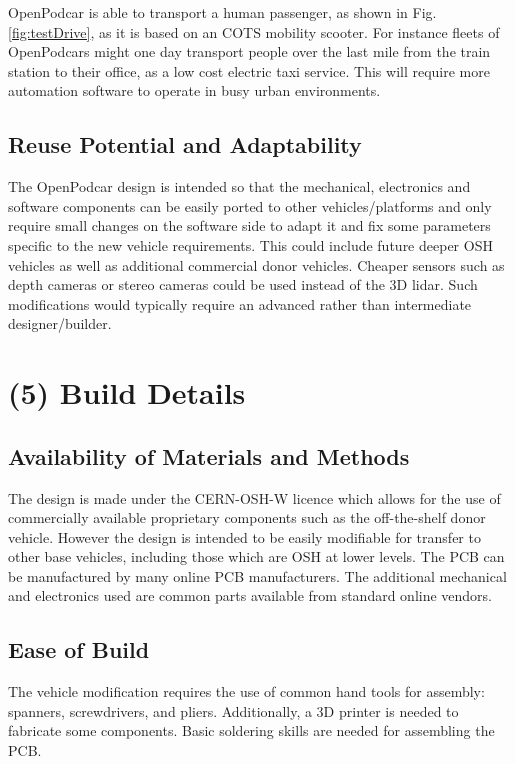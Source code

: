 \documentclass[a4paper]{article}
\begin{document}
	OpenPodcar is able to transport a human passenger, as shown in Fig. \ref{fig:testDrive}, as it is based on an COTS mobility scooter.  For instance fleets of OpenPodcars might one day transport people over the last mile from the train station to their office, as a low cost electric taxi service. This will require more automation software to operate in busy urban environments.
	
	\subsection{Reuse Potential and Adaptability}\label{h.6wkumyl0ejrh}
	
	The OpenPodcar design is intended so that the mechanical, electronics and software components can be easily ported to other vehicles/platforms and only require small changes on the software side to adapt it and fix some parameters specific to the new vehicle requirements. This could include future deeper OSH vehicles as well as additional commercial donor vehicles. Cheaper sensors such as depth cameras or stereo cameras could be used instead of the 3D lidar. Such modifications would typically require an advanced rather than intermediate designer/builder.
	
	
	\section{(5) Build Details}\label{h.l8i9vokvs0bj}
	
	\subsection{Availability of Materials and Methods}\label{h.60suejv0jlzi}
	
	The design is made under the CERN-OSH-W licence which allows for the use of commercially available proprietary components such as the off-the-shelf donor vehicle. However the design is intended to be easily modifiable for transfer to other base vehicles, including those which are OSH at lower levels. The PCB can be manufactured by many online PCB manufacturers. The additional mechanical and electronics used are common parts available from standard online vendors. 
	
	\subsection{Ease of Build}\label{h.wg823sgyb1e4}
	
	The vehicle modification requires the use of common hand tools for assembly: spanners, screwdrivers, and pliers. Additionally, a 3D printer is needed to fabricate some components. Basic soldering skills are needed for assembling the PCB. 
	
\end{document}

